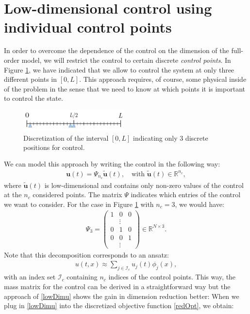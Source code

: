 \section{Low-dimensional control using individual control points}
\label{smallu_sec}
In order to overcome the dependence of the control on the dimension of the full-order model, we will restrict the control to certain discrete \textit{control points}. In Figure \ref{smallu}, we have indicated that we allow to control the system at only three different points in $[0,L]$. This approach requires, of course, some physical inside of the problem in the sense that we need to know at which points it is important to control the state.
\begin{figure}[H]
\centering
\includegraphics[width=0.49\textwidth]{plots/smallu.png}
\caption{Discretization of the interval $[0,L]$ indicating only $3$ discrete positions for control.}\label{smallu}
\end{figure}
We can model this approach by writing the control in the following way:
\begin{align}
\label{lowDimu}
\mathbf{u}(t) = \Psi_{n_c} \mathbf{\tilde u}(t), \quad \text{with } \mathbf{\tilde u}(t) \in \mathbb{R}^{n_c},
\end{align}
where $\mathbf{\tilde u}(t)$ is low-dimensional and contains only non-zero values of the control at the $n_c$ considered points. The matrix $\Psi$ indicates which entries of the control we want to consider. For the case in Figure \ref{smallu} with $n_c  = 3$, we would have:
\begin{align*}
\Psi_3 = \begin{pmatrix} 1 & 0 & 0 \\
                           &   \vdots & \\
                         0 & 1 & 0  \\
                         0 & 0 & 1  \\
                           &  \vdots &  \end{pmatrix} \in \mathbb{R}^{N \times 3}.
\end{align*}
Note that this decomposition corresponds to an ansatz:
\begin{align*}
u(t,x) \approx \sum_{j \in \mathcal{I}_{c}} u_j(t) \phi_j(x),
\end{align*}
with an index set $\mathcal{I}_{c}$ containing $n_c$ indices of the control points. This way, the mass matrix for the control can be derived in a straightforward way but the approach of \eqref{lowDimu} shows the gain in dimension reduction better: When we plug in \eqref{lowDimu} into the discretized objective function \eqref{redOpt}, we obtain:
